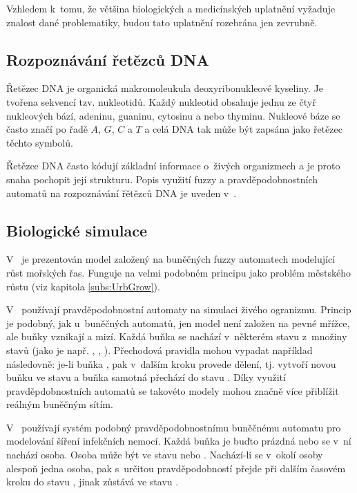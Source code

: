 Vzhledem k~tomu, že většina biologických a medicínských uplatnění vyžaduje znalost dané problematiky, budou tato uplatnění rozebrána jen zevrubně.

\subsection{Rozpoznávání řetězců DNA} \label{subs:DNA}
Řetězec DNA je organická makromoleukula deoxyribonukleové kyseliny. Je tvořena sekvencí tzv. nukleotidů. Každý nukleotid obsahuje jednu ze čtyř nukleových bází, adeninu, guaninu, cytosinu a nebo thyminu. Nukleové báze se často značí po řadě $A$, $G$, $C$ a $T$ a celá DNA tak může být zapsána jako řetězec těchto symbolů.

Řetězce DNA často kódují základní informace o~živých organizmech a je proto snaha pochopit její strukturu. Popis využití fuzzy a pravděpodobnostních automatů na rozpoznávání řětězců DNA je uveden v~\cite{SnaKepAbrHas-AproxStriMatchFuzzAut, Ron-AutLeaApp, ZlaSteSch-FiStaConTraFemPro, Her-ProAriAutAppSoComFraBioSeqAna}. 

\subsection{Biologické simulace}
V~\cite{CheMyn-ModAlgBloDutCosWat+} je prezentován model založený na buněčných fuzzy automatech modelující růst mořských řas. Funguje na velmi podobném principu jako problém městského růstu (viz kapitola \ref{subs:UrbGrow}).

V~\cite{MilAtl-ProAuModEpiCelNet} používají pravděpodobnostní automaty na simulaci živého ogranizmu. Princip je podobný, jak u~buněčných automatů, jen model není založen na pevné mřížce, ale buňky vznikají a mizí. Každá buňka se nachází v~některém stavu z~množiny stavů (jako je např. , , ). Přechodová pravidla mohou vypadat například následovně: je-li buňka , pak v~dalším kroku provede dělení, tj. vytvoří novou buňku ve stavu  a buňka samotná přechází do stavu . Díky využití pravděpdobnostních automatů se takovéto modely mohou značně více přiblížit reálným buněčným sítím.

V~\cite{BocChe-CriBePrAuNetModSprInfDis+} používají systém podobný pravděpodobnostnímu buněčnému automatu pro modelování šíření infekčních nemocí. Každá buňka je buďto prázdná nebo se v~ní nachází osoba. Osoba může být ve stavu  nebo . Nachází-li se v~okolí  osoby alespoň jedna  osoba, pak s~určitou pravděpodobností přejde při dalším časovém kroku do stavu , jinak zůstává ve stavu . 

